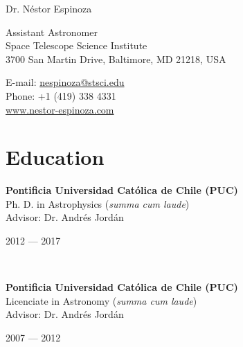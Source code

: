\documentclass[12pt, a4paper]{article} %
\begin{document}

{\LARGE Dr. N\'estor Espinoza}\\[0.2cm] %
\begin{minipage}[t]{0.63\textwidth}
Assistant Astronomer\\
Space Telescope Science Institute\\
3700 San Martin Drive, Baltimore, MD 21218, USA \\
\end{minipage}
\begin{minipage}[t]{0.37\textwidth}
E-mail: \href{mailto:nespinoza@stsci.edu}{nespinoza@stsci.edu}\\
Phone: +1 (419) 338 4331\\ 
\url{www.nestor-espinoza.com}
\end{minipage}

\hrulefill
\section*{Education}


\begin{minipage}[t]{0.6\textwidth}
\begin{flushleft}%
  \setlength{\leftskip}{0.2cm}%
\textbf{Pontificia Universidad Cat\'olica de Chile (PUC)}\\
Ph. D. in Astrophysics (\textit{summa cum laude})\\
Advisor: Dr. Andr\'es Jord\'an
 
\end{flushleft}
\end{minipage}
\begin{minipage}[t]{0.4\textwidth}
\hfill 2012 --- 2017 
\end{minipage}\\

\begin{minipage}[t]{0.6\textwidth}
\begin{flushleft}%
  \setlength{\leftskip}{0.2cm}%
\textbf{Pontificia Universidad Cat\'olica de Chile (PUC)}\\
 Licenciate in Astronomy (\textit{summa cum laude})\\
 Advisor: Dr. Andr\'es Jord\'an
 \end{flushleft}
\end{minipage}
\begin{minipage}[t]{0.4\textwidth}
\hfill 2007 --- 2012 
\end{minipage}
\end{document}
